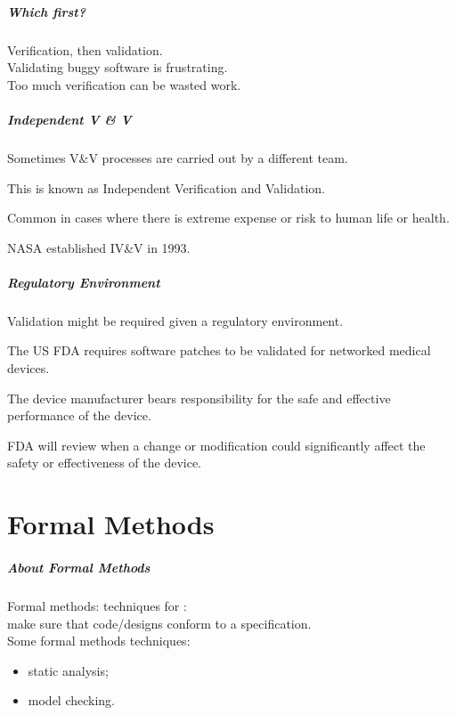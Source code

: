 \begin{frame}
\frametitle{Which first?}
\begin{changemargin}{1cm}

Verification, then validation.\\[1em]

Validating buggy software is frustrating.\\

Too much verification can be wasted work.
\end{changemargin}
\end{frame}


\begin{frame}
\frametitle{Independent V \& V}
\begin{changemargin}{1cm}

Sometimes V\&V processes are carried out by a different team.

This is known as \alert{Independent Verification and Validation}. 

Common in cases where there is extreme expense or risk to human life or health. 

NASA established IV\&V in 1993.

\end{changemargin}
\end{frame}

\begin{frame}
\frametitle{Regulatory Environment}
\begin{changemargin}{1cm}

Validation might be required given a regulatory environment. 

The US FDA requires software patches to be validated for networked medical devices. 

The device manufacturer bears responsibility for the safe and effective performance of the device.

FDA will review when a change or modification could significantly affect the safety or effectiveness of the device.

\end{changemargin}
\end{frame}

\part{Formal Methods}
\frame{\partpage}

\begin{frame}
\frametitle{About Formal Methods}
\begin{changemargin}{1cm}

Formal methods: techniques for :\\
\qquad make sure that code/designs conform to a specification.\\[1em]

Some formal methods techniques:
\begin{itemize}
\item static analysis;
\item model checking.
\end{itemize}

\end{changemargin}
\end{frame}

